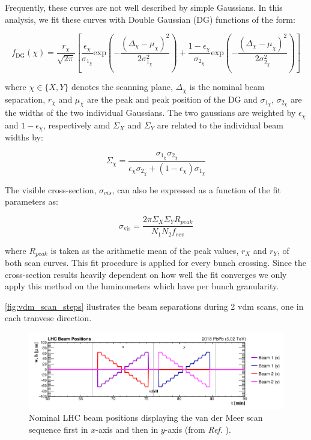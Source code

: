 Frequently, these curves are not well described by simple Gaussians. In this analysis, we fit these curves with Double Gaussian (DG) functions of the form:

\begin{equation}
    f_{\text{DG}}(\chi) = 
    \frac{r_{\chi}}{\sqrt{2\pi}} 
    \left[ 
        \frac{\epsilon_{\chi}}{\sigma_{1_{\chi}}} \text{exp} \left( -\frac{\left( \Delta_{\chi} - \mu_{\chi} \right)^2}{2\sigma^2_{1_{\chi}}} \right) +
        \frac{1 - \epsilon_{\chi}}{\sigma_{2_{\chi}}} \text{exp} \left( -\frac{\left( \Delta_{\chi} - \mu_{\chi} \right)^2}{2\sigma^2_{2_{\chi}}} \right)
    \right]
\end{equation}

where $\chi \in \{X, Y\}$ denotes the scanning plane, $\Delta_{\chi}$ is the nominal beam separation, $r_{\chi}$ and $\mu_{\chi}$ are the peak and peak position of the DG and $\sigma_{1_{\chi}}$, $\sigma_{2_{\chi}}$ are the widths of the two individual Gaussians. The two gaussians are weighted by $\epsilon_{\chi}$ and $1 - \epsilon_{\chi}$, respectively amd $\Sigma_{X}$ and $\Sigma_{Y}$ are related to the individual beam widths by: 

\begin{equation}
    \Sigma_{\chi} = \frac{\sigma_{1_{\chi}}\sigma_{2_{\chi}}}{\epsilon_{\chi}\sigma_{2_{\chi}} + \left( 1 - \epsilon_{\chi}\right) \sigma_{1_{\chi}}}
\end{equation}

The visible cross-section, $\sigma_{vis}$, can also be expressed as a function of the fit parameters as:

\begin{equation}
    \sigma_{\mathrm{vis}} =  \frac{2\pi \Sigma_{X} \Sigma_{Y} R_{peak}}{N_1 N_2 f_{rev}}
\end{equation}

where $R_{peak}$ is taken as the arithmetic mean of the peak values, $r_X$ and $r_Y$, of both scan curves. This fit procedure is applied for every bunch crossing. Since the cross-section results heavily dependent on how well the fit converges we only apply this method on the luminometers which have per bunch granularity.

\autoref{fig:vdm_scan_steps} ilustrates the beam separations during 2 vdm scans, one in each tranvese direction.

\begin{figure}[h]
	\centering
	\includegraphics[width=\textwidth]{images/assets/vdm_scan_steps.png}
	\caption{Nominal LHC beam positions displaying the van der Meer scan sequence first in $x$-axis and then in $y$-axis (from \textit{Ref.} \cite{Saariokari:2826125}).}
	\label{fig:vdm_scan_steps}
\end{figure}


